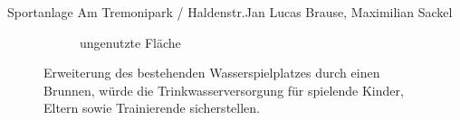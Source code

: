 \documentclass{../../templates/amendment}
\begin{document}
\begin{boxed}{Sportanlage Am Tremonipark / Haldenstr.}{Jan Lucas Brause, Maximilian Sackel}
\begin{figure}[htpb]
\begin{subfigure}[]{0.49\textwidth}
\begin{center}
                \caption{ungenutzte Fläche}%
            \end{center}
        \end{subfigure}
        \caption{Erweiterung des bestehenden Wasserspielplatzes durch einen
            Brunnen, würde die Trinkwasserversorgung für spielende Kinder, Eltern
        sowie Trainierende sicherstellen.}
    \end{figure}
\end{boxed}
\end{document}
